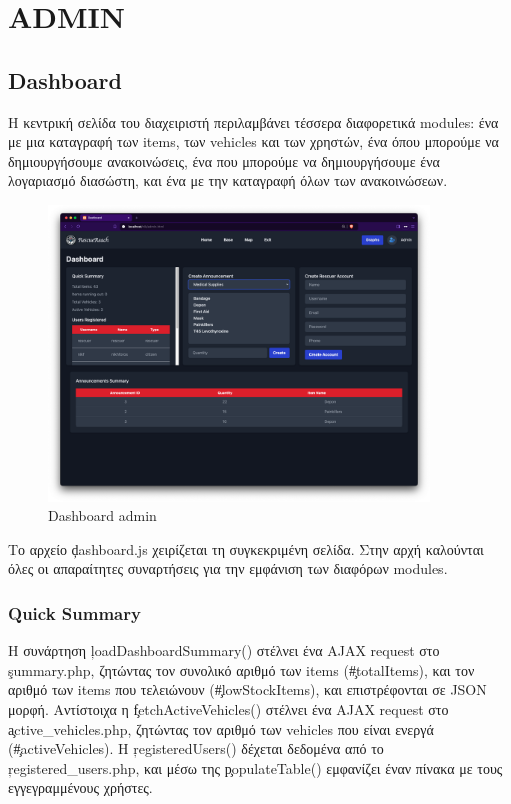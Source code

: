 \section{ADMIN}
    \subsection{Dashboard}
        Η κεντρική σελίδα του διαχειριστή περιλαμβάνει τέσσερα διαφορετικά modules: ένα με μια καταγραφή των items, των vehicles και των χρηστών,
            ένα όπου μπορούμε να δημιουργήσουμε ανακοινώσεις, ένα που μπορούμε να δημιουργήσουμε ένα λογαριασμό διασώστη, και ένα με την καταγραφή όλων των ανακοινώσεων.

        \vspace{-1em}
        \begin{figure}[H] \noindent \centering
            \includegraphics[width=0.9\textwidth]{img/admin-dashboard}
            \vspace{-1em}
            \caption{Dashboard admin}
        \end{figure}

        Το αρχείο \c{dashboard.js} χειρίζεται τη συγκεκριμένη σελίδα.
        Στην αρχή καλούνται όλες οι απαραίτητες συναρτήσεις για την εμφάνιση των διαφόρων modules.

        \subsubsection{Quick Summary}
            Η συνάρτηση \c{loadDashboardSummary()} στέλνει ένα AJAX request στο \c{summary.php}, ζητώντας τον συνολικό αριθμό των items (\c{#totalItems}),
                και τον αριθμό των items που τελειώνουν (\c{#lowStockItems}), και επιστρέφονται σε JSON μορφή.
            Αντίστοιχα η \c{fetchActiveVehicles()} στέλνει ένα AJAX request στο \c{active\_vehicles.php}, ζητώντας τον αριθμό των vehicles που είναι ενεργά (\c{#activeVehicles}).
            Η \c{registeredUsers()} δέχεται δεδομένα από το \c{registered\_users.php}, και μέσω της \c{populateTable()} εμφανίζει έναν πίνακα με τους εγγεγραμμένους χρήστες.

